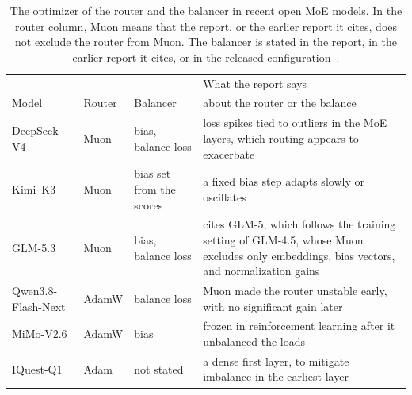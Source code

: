 \documentclass[11pt, a4paper]{article}
\begin{document}
\begin{table}[!b]
  \centering
  \caption{The optimizer of the router and the balancer in recent open MoE models. In the router column, Muon means that the report, or the earlier report it cites, does not exclude the router from Muon. The balancer is stated in the report, in the earlier report it cites, or in the released configuration~\citep{zai2026glm53, qwen2026flashnextcard, xiaomi2026mimoprocard}.}
  \label{tab:recipes}
  \small
  \begin{tabular}{@{}lll>{\raggedright\arraybackslash}p{6.5cm}@{}}
    \toprule
    & & & What the report says \\
    Model & Router & Balancer & about the router or the balance \\
    \midrule
    DeepSeek-V4 & Muon & bias, balance loss & loss spikes tied to outliers in the MoE layers, which routing appears to exacerbate \\ \addlinespace[2pt]
    Kimi~K3 & Muon & bias set from the scores & a fixed bias step adapts slowly or oscillates \\ \addlinespace[2pt]
    GLM-5.3 & Muon & bias, balance loss & cites GLM-5, which follows the training setting of GLM-4.5, whose Muon excludes only embeddings, bias vectors, and normalization gains \\ \addlinespace[2pt]
    Qwen3.8-Flash-Next & AdamW & balance loss & Muon made the router unstable early, with no significant gain later \\ \addlinespace[2pt]
    MiMo-V2.6 & AdamW & bias & frozen in reinforcement learning after it unbalanced the loads \\ \addlinespace[2pt]
    IQuest-Q1 & Adam & not stated & a dense first layer, to mitigate imbalance in the earliest layer \\
    \bottomrule
  \end{tabular}
\end{table}
\end{document}
